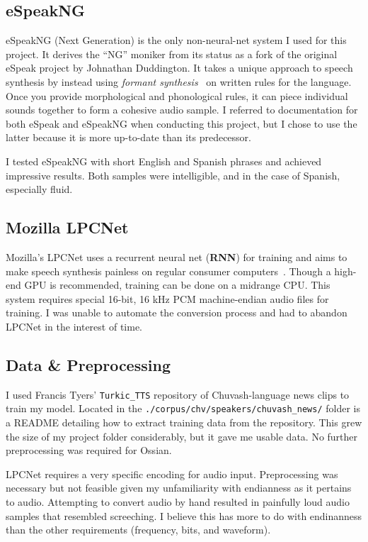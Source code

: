 \documentclass[11pt,a4paper]{article}
\begin{document}
\subsection{eSpeakNG}\label{sect:espeakng}
eSpeakNG (Next Generation) is the only non-neural-net system I used for this project. It derives the ``NG'' moniker from its status as a fork of the original eSpeak project by Johnathan Duddington. It takes a unique approach to speech synthesis by instead using \textit{formant synthesis}~\cite{espeak-og} on written rules for the language. Once you provide morphological and phonological rules, it can piece individual sounds together to form a cohesive audio sample. I referred to documentation for both eSpeak and eSpeakNG when conducting this project, but I chose to use the latter because it is more up-to-date than its predecessor.

I tested eSpeakNG with short English and Spanish phrases and achieved impressive results. Both samples were intelligible, and in the case of Spanish, especially fluid.

\subsection{Mozilla LPCNet}\label{ssec:lpcnet}
Mozilla's LPCNet uses a recurrent neural net (\textbf{RNN}) for training and aims to make speech synthesis painless on regular consumer computers~\cite{moz-lpc}. Though a high-end GPU is recommended, training can be done on a midrange CPU. This system requires special 16-bit, 16 kHz PCM machine-endian audio files for training. I was unable to automate the conversion process and had to abandon LPCNet in the interest of time.

\subsection{Data \& Preprocessing}\label{ssec:data}
I used Francis Tyers' \texttt{Turkic\_TTS} repository of Chuvash-language news clips to train my model. Located in the \texttt{./corpus/chv/speakers/chuvash\_news/} folder is a README detailing how to extract training data from the repository. This grew the size of my project folder considerably, but it gave me usable data. No further preprocessing was required for Ossian.

LPCNet requires a very specific encoding for audio input. Preprocessing was necessary but not feasible given my unfamiliarity with endianness as it pertains to audio. Attempting to convert audio by hand resulted in painfully loud audio samples that resembled screeching. I believe this has more to do with endinanness than the other requirements (frequency, bits, and waveform).
\end{document}
